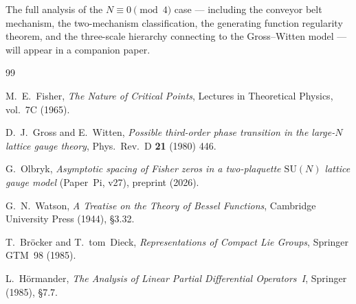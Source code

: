 \documentclass[12pt]{article}
\theoremstyle{remark}
\newcommand{\SU}{\mathrm{SU}}
\begin{document}
The full analysis of the $N \equiv 0 \pmod{4}$ case --- including the
conveyor belt mechanism, the two-mechanism classification, the generating
function regularity theorem, and the three-scale hierarchy connecting to
the Gross--Witten model --- will appear in a companion paper.


\begin{thebibliography}{99}

M.~E.~Fisher, \emph{The Nature of Critical Points},
Lectures in Theoretical Physics, vol.~7C (1965).

D.~J.~Gross and E.~Witten,
\emph{Possible third-order phase transition in the large-$N$ lattice gauge theory},
Phys.\ Rev.\ D \textbf{21} (1980) 446.

G.~Olbryk,
\emph{Asymptotic spacing of Fisher zeros in a two-plaquette $\SU(N)$
lattice gauge model} (Paper~Pi, v27), preprint (2026).

G.~N.~Watson,
\emph{A Treatise on the Theory of Bessel Functions},
Cambridge University Press (1944), \S3.32.

T.~Br\"ocker and T.~tom~Dieck,
\emph{Representations of Compact Lie Groups},
Springer GTM~98 (1985).

L.~H\"ormander,
\emph{The Analysis of Linear Partial Differential Operators~I},
Springer (1985), \S7.7.

\end{thebibliography}
\end{document}
